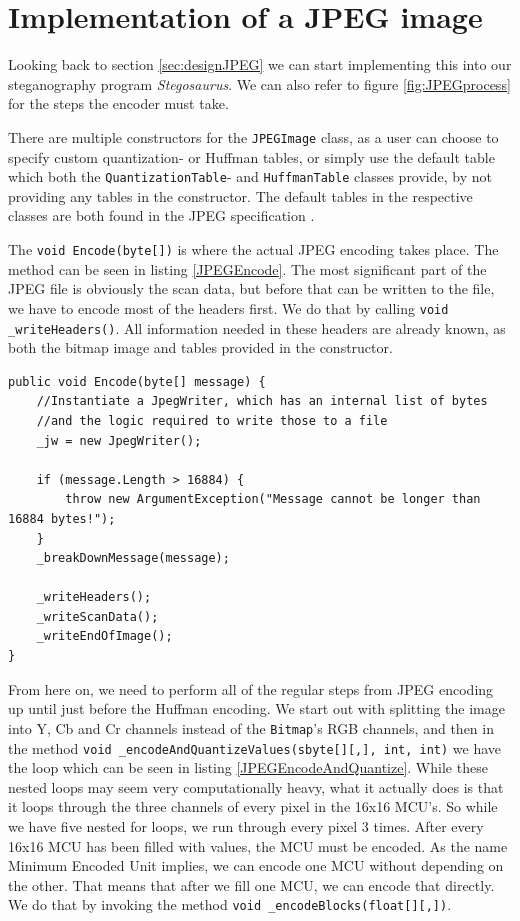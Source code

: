 \section{Implementation of a JPEG image}
Looking back to section \ref{sec:designJPEG} we can start implementing this into our steganography program \textit{Stegosaurus}.
We can also refer to figure \ref{fig:JPEGprocess} for the steps the encoder must take.

There are multiple constructors for the \lstinline|JPEGImage| class, as a user can choose to specify custom quantization- or Huffman tables, or simply use the default table which both the \lstinline|QuantizationTable|- and \lstinline|HuffmanTable| classes provide, by not providing any tables in the constructor.
The default tables in the respective classes are both found in the JPEG specification \citep[Annex k]{JPEGStandard}.

The \lstinline|void Encode(byte[])| is where the actual JPEG encoding takes place.
The method can be seen in listing \ref{JPEGEncode}.
The most significant part of the JPEG file is obviously the scan data, but before that can be written to the file, we have to encode most of the headers first.
We do that by calling \lstinline|void _writeHeaders()|.
All information needed in these headers are already known, as both the bitmap image and tables provided in the constructor.

\begin{lstlisting}[firstnumber=136,label=JPEGEncode, caption={\lstinline|JPEGImage.Encode| method \textbf{File: }JPEGImage.cs}]
public void Encode(byte[] message) {
    //Instantiate a JpegWriter, which has an internal list of bytes 
    //and the logic required to write those to a file
    _jw = new JpegWriter();

    if (message.Length > 16884) {
        throw new ArgumentException("Message cannot be longer than 16884 bytes!");
    }
    _breakDownMessage(message);

    _writeHeaders();
    _writeScanData();
    _writeEndOfImage();
}
\end{lstlisting}

From here on, we need to perform all of the regular steps from JPEG encoding up until just before the Huffman encoding.
We start out with splitting the image into Y, Cb and Cr channels instead of the \lstinline|Bitmap|'s RGB channels, and then in the method \lstinline|void _encodeAndQuantizeValues(sbyte[][,], int, int)| we have the loop which can be seen in listing \ref{JPEGEncodeAndQuantize}.
While these nested loops may seem very computationally heavy, what it actually does is that it loops through the three channels of every pixel in the 16x16 MCU's.
So while we have five nested for loops, we run through every pixel 3 times.
After every 16x16 MCU has been filled with values, the MCU must be encoded.
As the name Minimum Encoded Unit implies, we can encode one MCU without depending on the other.
That means that after we fill one MCU, we can encode that directly. We do that by invoking the method \lstinline|void _encodeBlocks(float[][,])|.

